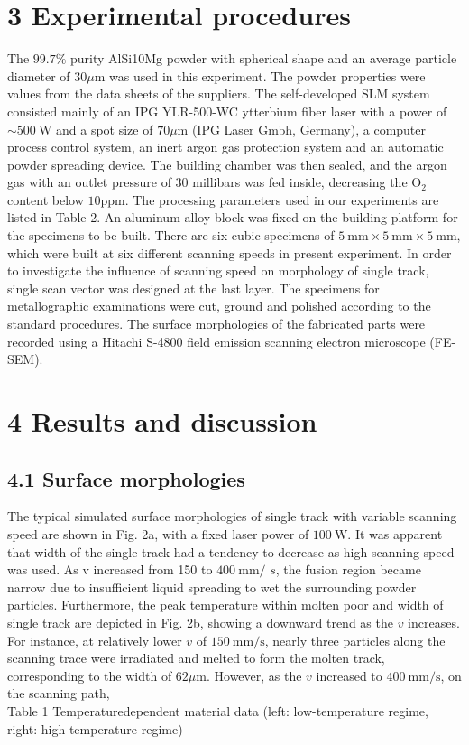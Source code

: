 \documentclass[10pt]{article}
\begin{document}
\section*{3 Experimental procedures}
The $99.7 \%$ purity AlSi10Mg powder with spherical shape and an average particle diameter of $30 \mu \mathrm{m}$ was used in this experiment. The powder properties were values from the data sheets of the suppliers. The self-developed SLM system consisted mainly of an IPG YLR-500-WC ytterbium fiber laser with a power of $\sim 500 \mathrm{~W}$ and a spot size of $70 \mu \mathrm{m}$ (IPG Laser Gmbh, Germany), a computer process control system, an inert argon gas protection system and an automatic powder spreading device. The building chamber was then sealed, and the argon gas with an outlet pressure of 30 millibars was fed inside, decreasing the $\mathrm{O}_{2}$ content below $10 \mathrm{ppm}$. The processing parameters used in our experiments are listed in Table 2. An aluminum alloy block was fixed on the building platform for the specimens to be built. There are six cubic specimens of $5 \mathrm{~mm} \times 5 \mathrm{~mm} \times 5 \mathrm{~mm}$, which were built at six different scanning speeds in present experiment. In order to investigate the influence of scanning speed on morphology of single track, single scan vector was designed at the last layer. The specimens for metallographic examinations were cut, ground and polished according to the standard procedures. The surface morphologies of the fabricated parts were recorded using a Hitachi S-4800 field emission scanning electron microscope (FE-SEM).

\section*{4 Results and discussion}
\subsection*{4.1 Surface morphologies}
The typical simulated surface morphologies of single track with variable scanning speed are shown in Fig. 2a, with a fixed laser power of $100 \mathrm{~W}$. It was apparent that width of the single track had a tendency to decrease as high scanning speed was used. As v increased from 150 to $400 \mathrm{~mm} /$ $s$, the fusion region became narrow due to insufficient liquid spreading to wet the surrounding powder particles. Furthermore, the peak temperature within molten poor and width of single track are depicted in Fig. 2b, showing a downward trend as the $v$ increases. For instance, at relatively lower $v$ of $150 \mathrm{~mm} / \mathrm{s}$, nearly three particles along the scanning trace were irradiated and melted to form the molten track, corresponding to the width of $62 \mu \mathrm{m}$. However, as the $v$ increased to $400 \mathrm{~mm} / \mathrm{s}$, on the scanning path,\\
Table 1 Temperaturedependent material data (left: low-temperature regime, right: high-temperature regime)
\end{document}
